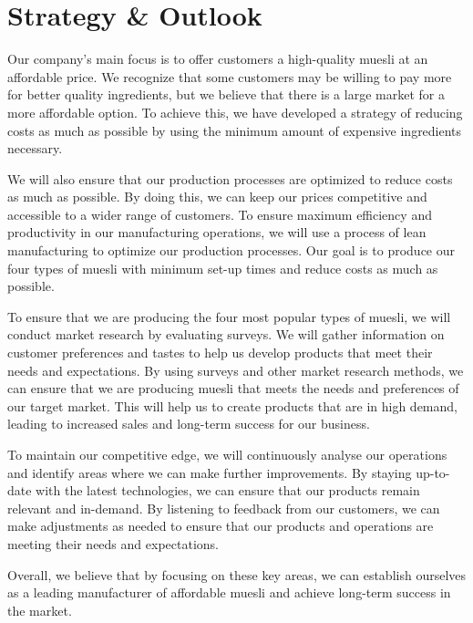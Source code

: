 \documentclass{article}
\begin{document}
	\section*{Strategy \& Outlook}
	
	Our company's main focus is to offer customers a high-quality muesli at an affordable price. We recognize that some customers may be willing to pay more for better quality ingredients, but we believe that there is a large market for a more affordable option. To achieve this, we have developed a strategy of reducing costs as much as possible by using the minimum amount of expensive ingredients necessary.
	
	We will also ensure that our production processes are optimized to reduce costs as much as possible. By doing this, we can keep our prices competitive and accessible to a wider range of customers. To ensure maximum efficiency and productivity in our manufacturing operations, we will use a process of lean manufacturing to optimize our production processes. Our goal is to produce our four types of muesli with minimum set-up times and reduce costs as much as possible.
	
	To ensure that we are producing the four most popular types of muesli, we will conduct market research by evaluating surveys. We will gather information on customer preferences and tastes to help us develop products that meet their needs and expectations. By using surveys and other market research methods, we can ensure that we are producing muesli that meets the needs and preferences of our target market. This will help us to create products that are in high demand, leading to increased sales and long-term success for our business.
	
	To maintain our competitive edge, we will continuously analyse our operations and identify areas where we can make further improvements. By staying up-to-date with the latest technologies, we can ensure that our products remain relevant and in-demand. By listening to feedback from our customers, we can make adjustments as needed to ensure that our products and operations are meeting their needs and expectations.
	
	Overall, we believe that by focusing on these key areas, we can establish ourselves as a leading manufacturer of affordable muesli and achieve long-term success in the market.
\end{document}
